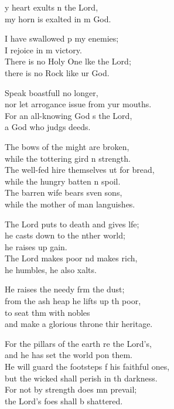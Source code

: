 \settowidth{\versewidth}{He will guard the footsteps of his faithful ones, *}
\begin{psalmverse}%
  \begin{patverse}
    y heart exults \pointup{\i}n the Lord,\Med\\
my horn is exalted in m God.

I have swallowed p my enemies;\Med\\
I rejoice in m victory.\\
There is no Holy One l\pointup{\i}ke the Lord;\Med\\
there is no Rock like ur God.

Speak boastfull no longer,\Med\\
nor let arrogance issue from yur mouths.\\
For an all-knowing God \pointup{\i}s the Lord,\Med\\
a God who judgs deeds.

The bows of the might are broken,\Med\\
while the tottering gird n strength.\\
The well-fed hire themselves ut for bread,\Med\\
while the hungry batten n spoil.\\
The barren wife bears sven sons,\Med\\
while the mother of man languishes.

The Lord puts to death and gives l\pointup{\i}fe;\Flex\\
he casts down to the nther world;\Med\\
he raises up gain.\\
The Lord makes poor nd makes rich,\Med\\
he humbles, he also xalts.

He raises the needy frm the dust;\Med\\
from the ash heap he lifts up th poor,\\
to seat thm with nobles\Med\\
and make a glorious throne thir heritage.

For the pillars of the earth re the Lord’s,\Med\\
and he has set the world pon them.\\
He will guard the footsteps f his faithful ones,\Med\\
but the wicked shall perish in th darkness.\\
For not by strength does mn prevail;\Med\\
the Lord’s foes shall b shattered.


\end{patverse}
\end{psalmverse}

